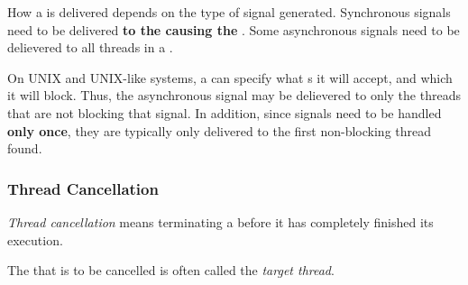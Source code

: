 How a  is delivered depends on the type of signal generated.
Synchronous signals need to be delivered \textbf{to the  causing the }.
Some asynchronous signals need to be delievered to all threads in a .

On UNIX and UNIX-like systems, a  can specify what s it will accept, and which it will block.
Thus, the asynchronous signal may be delievered to only the threads that are not blocking that signal.
In addition, since signals need to be handled \textbf{only once}, they are typically only delivered to the first non-blocking thread found.

\subsubsection{Thread Cancellation}\label{subsubsec:Thread_Cancellation}
\begin{definition}\label{def:Thread_Cancellation}
  \emph{Thread cancellation} means terminating a  before it has completely finished its execution.

  \begin{remark}\label{rmk:Target_Thread}
    The  that is to be cancelled is often called the \emph{target thread}.
  \end{remark}
\end{definition}



